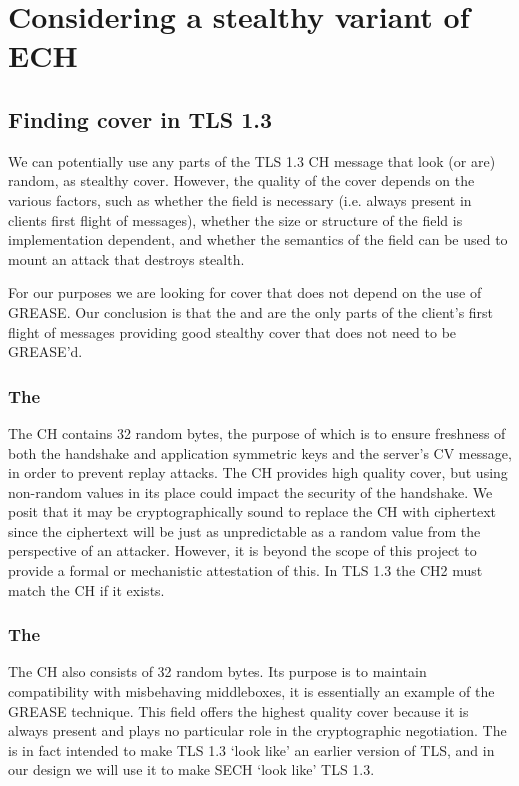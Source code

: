 \section{Considering a stealthy variant of ECH}
\subsection{Finding cover in TLS 1.3}
\label{sec:sech-cover-constraints}
We can potentially use any parts of the TLS 1.3 \ac{CH} message that look (or are) random,
as stealthy cover.
However, the quality of the cover depends on the
various factors,
such as whether the field is necessary (i.e. always present in clients first flight of messages),
whether the size or structure of the field
is implementation dependent,
and whether the semantics of the field can be used
to mount an attack that destroys stealth.

For our purposes we are looking for cover that does not depend
on the use of \ac{GREASE}. Our conclusion is that the 
and  are the only parts of the client's first flight
of messages providing good stealthy cover that does not need to be \ac{GREASE}'d.

\subsubsection{The }
The \ac{CH} contains 32 random bytes, the purpose of which is to
ensure freshness of both the handshake and application symmetric keys
and the server's \ac{CV} message,
in order to prevent replay attacks.
The \ac{CH} provides high quality cover,
but using non-random values in its place could impact the security of the handshake.
We posit that it may be cryptographically sound
to replace the \ac{CH} with ciphertext
since the ciphertext will be just as unpredictable as a random value from the perspective of an attacker.
However, it is beyond the scope of this project to
provide a formal or mechanistic attestation of this.
In \ac{TLS} 1.3 the \ac{CH2} must match the \ac{CH} if it exists.

\subsubsection{The }
The \ac{CH} also consists of 32 random bytes.
Its purpose
is to maintain compatibility with misbehaving
middleboxes,
it is essentially an example of the \ac{GREASE}
technique.
This field offers the highest quality cover because it is always present and plays no particular
role in the cryptographic negotiation.
The  is in fact intended to make \ac{TLS} 1.3 `look like' an earlier version of \ac{TLS},
and in our design we will use it to make \ac{SECH} `look like' \ac{TLS} 1.3.

